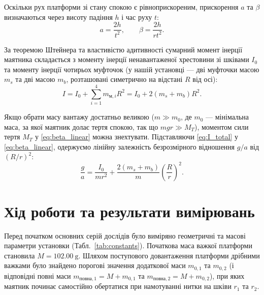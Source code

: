 \documentclass[ukrainian]{ucaphyslab}
\begin{document}
Оскільки рух платформи зі стану спокою є рівноприскореним, прискорення $a$ та $\beta$ визначаються через висоту падіння $h$ і час руху $t$:
\begin{equation}
  a = \frac{2h}{t^2}, \qquad \beta = \frac{2h}{r t^2}.
  \label{eq:kinematics}
\end{equation}

За теоремою Штейнера та властивістю адитивності сумарний момент інерції маятника складається з моменту інерції ненавантаженої хрестовини зі шківами $I_0$ та моменту інерції чотирьох муфточок (у нашій установці — дві муфточки масою $m_s$ та дві масою $m_b$, розташовані симетрично на відстані $R$ від осі):
\begin{equation}
  I = I_0 + \sum_{i=1}^{4} m_{\text{м},i} R^2 = I_0 + 2(m_s + m_b)R^2.
  \label{eq:I_total}
\end{equation}

Якщо обрати масу вантажу достатньо великою ($m \gg m_0$, де $m_0$ — мінімальна маса, за якої маятник долає тертя спокою, так що $mgr \gg M_T$), моментом сили тертя $M_T$ у \eqref{eq:beta_linear} можна знехтувати. Підставляючи \eqref{eq:I_total} у \eqref{eq:beta_linear}, одержуємо лінійну залежність безрозмірного відношення $g/a$ від $(R/r)^2$:
\begin{equation}
  \frac{g}{a} = \frac{I_0}{mr^2} + \frac{2(m_s + m_b)}{m}\left(\frac{R}{r}\right)^2.
  \label{eq:ga_linear}
\end{equation}

\section{Хід роботи та результати вимірювань}
Перед початком основних серій дослідів було виміряно геометричні та масові параметри установки (Табл.~\ref{tab:constants}). Початкова маса важкої платформи становила $M = \SI{102.00}{\gram}$. Шляхом поступового довантаження платформи дрібними важками було знайдено порогові значення додаткової маси $m_{0,1}$ та $m_{0,2}$ (і відповідні повні маси $m_{\text{повна},1} = M + m_{0,1}$ та $m_{\text{повна},2} = M + m_{0,2}$), при яких маятник починає самостійно обертатися при намотуванні нитки на шківи $r_1$ та $r_2$.
\end{document}
